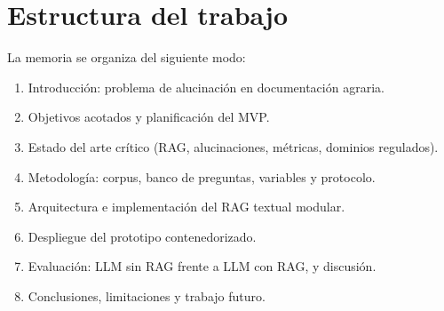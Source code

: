 \section{Estructura del trabajo}

La memoria se organiza del siguiente modo:
\begin{enumerate}
  \item Introducción: problema de alucinación en documentación agraria.
  \item Objetivos acotados y planificación del MVP.
  \item Estado del arte crítico (RAG, alucinaciones, métricas, dominios regulados).
  \item Metodología: corpus, banco de preguntas, variables y protocolo.
  \item Arquitectura e implementación del RAG textual modular.
  \item Despliegue del prototipo contenedorizado.
  \item Evaluación: LLM sin RAG frente a LLM con RAG, y discusión.
  \item Conclusiones, limitaciones y trabajo futuro.
\end{enumerate}
